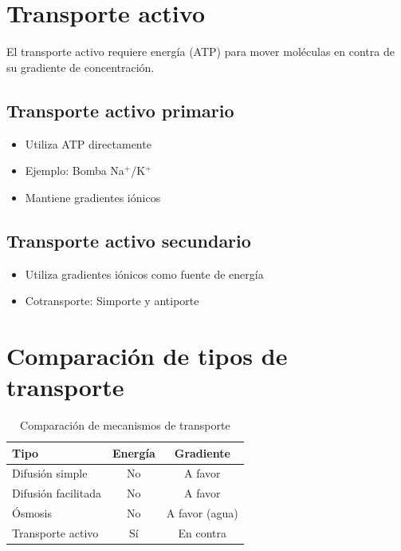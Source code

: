 \section{Transporte activo}

El transporte activo requiere energía (ATP) para mover moléculas en contra de su gradiente de concentración.

\subsection{Transporte activo primario}
\begin{itemize}
    \item Utiliza ATP directamente
    \item Ejemplo: Bomba Na$^+$/K$^+$
    \item Mantiene gradientes iónicos
\end{itemize}

\subsection{Transporte activo secundario}
\begin{itemize}
    \item Utiliza gradientes iónicos como fuente de energía
    \item Cotransporte: Simporte y antiporte
\end{itemize}

\section{Comparación de tipos de transporte}

\begin{table}[h]
\centering
\begin{tabular}{|l|c|c|}
\hline
\textbf{Tipo} & \textbf{Energía} & \textbf{Gradiente} \\
\hline
Difusión simple & No & A favor \\
\hline
Difusión facilitada & No & A favor \\
\hline
Ósmosis & No & A favor (agua) \\
\hline
Transporte activo & Sí & En contra \\
\hline
\end{tabular}
\caption{Comparación de mecanismos de transporte}
\end{table}